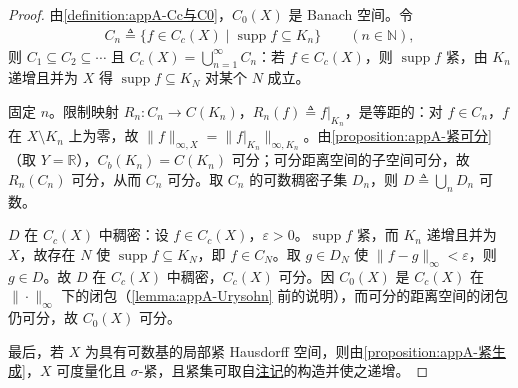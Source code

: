 \documentclass[../main.tex]{subfiles}
\begin{document}
\begin{proof}
由\cref{definition:appA-Cc与C0}，$C_0(X)$ 是 Banach 空间。令
\begin{align*}
C_n\triangleq\{f\in C_c(X)\mid \operatorname{supp}f\subseteq K_n\}\qquad(n\in\mathbb{N}),
\end{align*}
则 $C_1\subseteq C_2\subseteq\cdots$ 且 $C_c(X)=\bigcup_{n=1}^\infty C_n$：若 $f\in C_c(X)$，则 $\operatorname{supp}f$ 紧，由 $K_n$ 递增且并为 $X$ 得 $\operatorname{supp}f\subseteq K_N$ 对某个 $N$ 成立。

固定 $n$。限制映射 $R_n:C_n\to C(K_n)$，$R_n(f)\triangleq f|_{K_n}$，是等距的：对 $f\in C_n$，$f$ 在 $X\setminus K_n$ 上为零，故 $\|f\|_{\infty,X}=\|f|_{K_n}\|_{\infty,K_n}$。由\cref{proposition:appA-紧可分}（取 $Y=\mathbb{R}$），$C_b(K_n)=C(K_n)$ 可分；可分距离空间的子空间可分，故 $R_n(C_n)$ 可分，从而 $C_n$ 可分。取 $C_n$ 的可数稠密子集 $D_n$，则 $D\triangleq\bigcup_nD_n$ 可数。

$D$ 在 $C_c(X)$ 中稠密：设 $f\in C_c(X)$，$\varepsilon>0$。$\operatorname{supp}f$ 紧，而 $K_n$ 递增且并为 $X$，故存在 $N$ 使 $\operatorname{supp}f\subseteq K_N$，即 $f\in C_N$。取 $g\in D_N$ 使 $\|f-g\|_\infty<\varepsilon$，则 $g\in D$。故 $D$ 在 $C_c(X)$ 中稠密，$C_c(X)$ 可分。因 $C_0(X)$ 是 $C_c(X)$ 在 $\|\cdot\|_\infty$ 下的闭包（\cref{lemma:appA-Urysohn} 前的说明），而可分的距离空间的闭包仍可分，故 $C_0(X)$ 可分。

最后，若 $X$ 为具有可数基的局部紧 Hausdorff 空间，则由\cref{proposition:appA-紧生成}，$X$ 可度量化且 $\sigma$-紧，且紧集可取自\hyperref[remark:appA-可数基局部紧]{注记}的构造并使之递增。
\end{proof}
\end{document}
